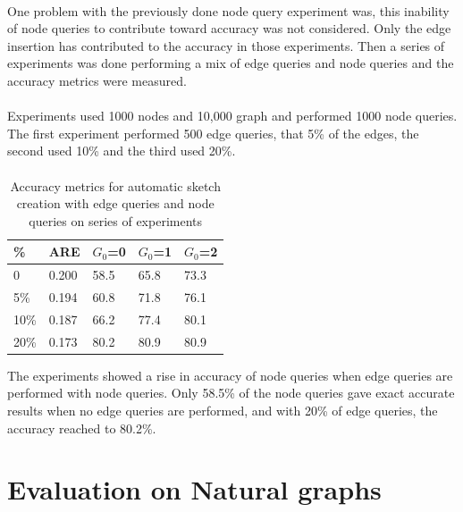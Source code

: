 \documentclass[12pt]{report}
\numberwithin{figure}{section}
\numberwithin{table}{section}
\begin{document}
\paragraph{}

One problem with the previously done node query experiment was, this inability of node queries to contribute toward accuracy was not considered. Only the edge insertion has contributed to the accuracy in those experiments. Then a series of experiments was done performing a mix of edge queries and node queries and the accuracy metrics were measured.

\paragraph{}

Experiments used 1000 nodes and 10,000 graph and performed 1000 node queries. The first experiment performed 500 edge queries, that 5\% of the edges, the second used 10\% and the third used 20\%. 

\paragraph{}

\begin{table}[H]
\centering
\begin{tabular}{|l|l|l|l|l|}
\hline
\%    & ARE     & $G_0$=0 & $G_0$=1 & $G_0$=2 \\ \hline
0 & 0.200 &   58.5  &  65.8   &   73.3  \\ \hline
5\% & 0.194 & 60.8   & 71.8   & 76.1  \\ \hline
10\% & 0.187 & 66.2   & 77.4   & 80.1   \\ \hline
20\% & 0.173 & 80.2   & 80.9   & 80.9   \\ \hline
\end{tabular}
\caption{Accuracy metrics for automatic sketch creation  with edge queries and node queries on series of experiments}
\end{table}


The experiments showed a rise in accuracy of node queries when edge queries are performed with node queries. Only 58.5\% of the node queries gave exact accurate results when no edge queries are performed, and with 20\% of edge queries, the accuracy reached to 80.2\%.

\section{Evaluation on Natural graphs}
\end{document}
